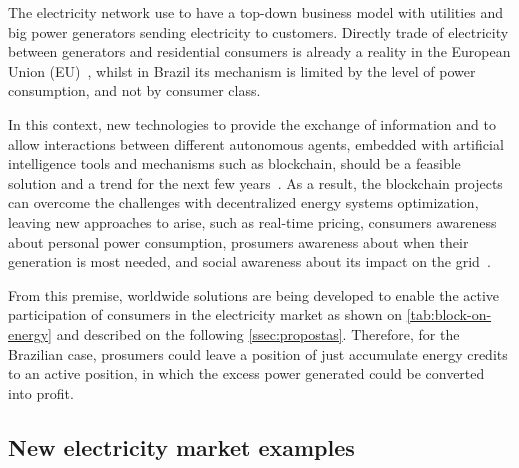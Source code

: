 The electricity network use to have a top-down business model with utilities and big power generators sending electricity to customers.
Directly trade of electricity between generators and residential consumers is already a reality in the European Union (EU)~\cite{blocktrading,Brasil-futuroEE},
whilst in Brazil its mechanism is limited by the level of power consumption, and not by consumer class.

In this context,
new technologies to provide the exchange of information and to allow interactions between different autonomous agents, %
embedded with artificial intelligence tools and mechanisms such as blockchain, should be a feasible solution and a trend for the next few years~\cite{Coelho2017MAS}. %
As a result, the blockchain projects can overcome the challenges with decentralized energy systems optimization,
leaving new approaches to arise, such as real-time pricing, consumers awareness about personal power consumption, prosumers awareness about when their generation is most needed, and social awareness about its impact on the grid~\cite{peck2017,wec2017}.

From this premise, worldwide solutions are being developed to enable the active participation of consumers in the electricity market as shown on \autoref{tab:block-on-energy} and described on the following \autoref{ssec:propostas}.
Therefore, for the Brazilian case, prosumers could leave a position of just accumulate energy credits to an active position, in which the excess power generated could be converted into profit. %

\subsection{New electricity market examples}%
\label{ssec:propostas}


